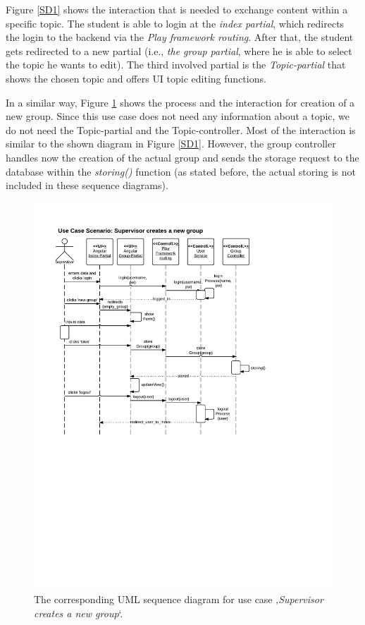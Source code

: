 Figure \ref{SD1} shows the interaction that is needed to exchange content within a specific topic. The student is able to login at the \emph{index partial}, which redirects the login to the backend via the \emph{Play framework routing}. After that, the student gets redirected to a new partial (i.e., \emph{the group partial}, where he is able to select the topic he wants to edit). The third involved partial is the \emph{Topic-partial} that shows the chosen topic and offers \ac{UI} topic editing functions.  

In a similar way, Figure \ref{SD2} shows the process and the interaction for creation of a new group. Since this use case does not need any information about a topic, we do not need the Topic-partial and the Topic-controller. Most of the interaction is similar to the shown diagram in Figure \ref{SD1}. However, the group controller handles now the creation of the actual group and sends the storage request to the database within the \emph{storing()} function (as stated before, the actual storing is not included in these sequence diagrams).

\begin{figure}[th]
\centerline{\includegraphics[width=1\textwidth]{gfx/SDCreateGroup}}
\caption{The corresponding \ac{UML} sequence diagram for use case ‚\emph{Supervisor creates a new group}‘.}
\label{SD2}
\end{figure} 

